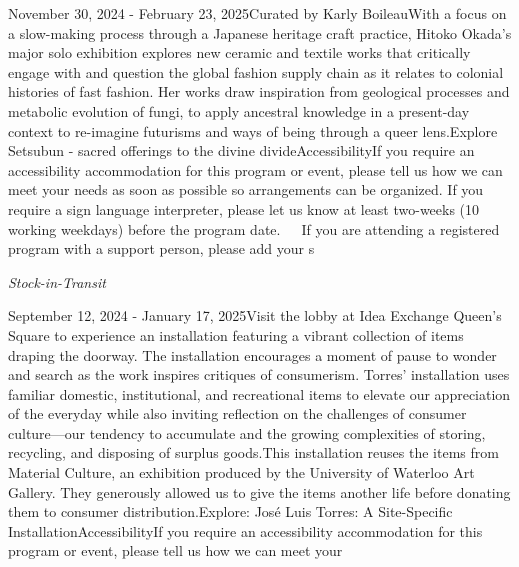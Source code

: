 \documentclass[letterpaper, 10pt]{article}
\newcommand{\subtitle}[1]{\textit{\large #1}\vspace{0.5em}}
\newcommand{\articlecontent}[1]{\small #1\vspace{1em}}
\begin{document}
\begin{multicols}{2}
{
\vspace{10px}

November 30, 2024 - February 23, 2025Curated by Karly BoileauWith a focus on a slow-making process through a Japanese heritage craft practice, Hitoko Okada’s major solo exhibition explores new ceramic and textile works that critically engage with and question the global fashion supply chain as it relates to colonial histories of fast fashion. Her works draw inspiration from geological processes and metabolic evolution of fungi, to apply ancestral knowledge in a present-day context to re-imagine futurisms and ways of being through a queer lens.Explore Setsubun - sacred offerings to the divine divideAccessibilityIf you require an accessibility accommodation for this program or event, please tell us how we can meet your needs as soon as possible so arrangements can be organized. If you require a sign language interpreter, please let us know at least two-weeks (10 working weekdays) before the program date.   If you are attending a registered program with a support person, please add your s
}
\vspace{10px}

\subtitle{Stock-in-Transit}

\articlecontent{

\qrcode[height=1.5cm]{https://ideaexchange.libnet.info/event/11807037}
\vspace{10px}

September 12, 2024 - January 17, 2025Visit the lobby at Idea Exchange Queen's Square to experience an installation featuring a vibrant collection of items draping the doorway. The installation encourages a moment of pause to wonder and search as the work inspires critiques of consumerism. Torres’ installation uses familiar domestic, institutional, and recreational items to elevate our appreciation of the everyday while also inviting reflection on the challenges of consumer culture—our tendency to accumulate and the growing complexities of storing, recycling, and disposing of surplus goods.This installation reuses the items from Material Culture, an exhibition produced by the University of Waterloo Art Gallery. They generously allowed us to give the items another life before donating them to consumer distribution.Explore: José Luis Torres: A Site-Specific InstallationAccessibilityIf you require an accessibility accommodation for this program or event, please tell us how we can meet your
}
\vspace{10px}


\end{multicols}
\end{document}

